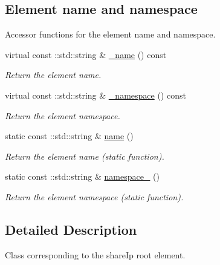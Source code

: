 \subsection*{Element name and namespace}
\label{_amgrpd4b5b61f6e07390f4af2465e04571f34}
Accessor functions for the element name and namespace. \begin{DoxyCompactItemize}
\item 
virtual const ::std::string \& \hyperlink{classopenstack_1_1xml_1_1ShareIp___a36604611c66165065cace00ae65ce41f}{\_\-name} () const 
\begin{DoxyCompactList}\small\item\em Return the element name. \item\end{DoxyCompactList}\item 
virtual const ::std::string \& \hyperlink{classopenstack_1_1xml_1_1ShareIp___a6bdb5a21abc87c77592ff375f69f9102}{\_\-namespace} () const 
\begin{DoxyCompactList}\small\item\em Return the element namespace. \item\end{DoxyCompactList}\item 
static const ::std::string \& \hyperlink{classopenstack_1_1xml_1_1ShareIp___a8599c3c0937442df08d8e217b77c2c85}{name} ()
\begin{DoxyCompactList}\small\item\em Return the element name (static function). \item\end{DoxyCompactList}\item 
static const ::std::string \& \hyperlink{classopenstack_1_1xml_1_1ShareIp___ac9e8d6c3d48b2ee02b33a46ad76a7dae}{namespace\_\-} ()
\begin{DoxyCompactList}\small\item\em Return the element namespace (static function). \item\end{DoxyCompactList}\end{DoxyCompactItemize}


\subsection{Detailed Description}
Class corresponding to the shareIp root element. 

